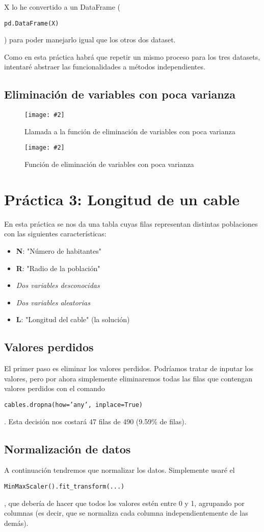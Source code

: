 \documentclass[
12pt, 
spanish, 
singlespacing,
headsepline
]{article}
\newcommand{\smallimage}[2]{
\begin{figure}[H]
	\caption{#1}
	\centering
	\texttt{[image: \#2]}
\end{figure}
}
\newcommand{\code}[1]{\colorbox{light-gray}{\parbox{\dimexpr\linewidth-2\fboxsep}{\strut  \texttt{#1}\strut}}}
\begin{document}
X lo he convertido a un DataFrame (\code{pd.DataFrame(X)}) para poder manejarlo igual que los otros dos dataset.

Como en esta práctica habrá que repetir un mismo proceso para los tres datasets, intentaré abstraer las funcionalidades a métodos independientes.

\subsection{Eliminación de variables con poca varianza}
\smallimage{Llamada a la función de eliminación de variables con poca varianza}{pl2/Figure_7.png}
\smallimage{Función de eliminación de variables con poca varianza}{pl2/Figure_7.1.png}

\section{Práctica 3: Longitud de un cable}
En esta práctica se nos da una tabla cuyas filas representan distintas poblaciones con las siguientes características:
\begin{itemize}
\item \textbf{N}: "Número de habitantes"
\item \textbf{R}: "Radio de la población"
\item \textit{Dos variables desconocidas}
\item \textit{Dos variables aleatorias}
\item \textbf{L}: "Longitud del cable" (la solución)
\end{itemize}

\subsection{Valores perdidos}
El primer paso es eliminar los valores perdidos. Podríamos tratar de inputar los valores, pero por ahora simplemente eliminaremos todas las filas que contengan valores perdidos con el comando \code{cables.dropna(how='any', inplace=True)}. Esta decisión nos costará 47 filas de 490 (9.59\% de filas).

\subsection{Normalización de datos}
A continuación tendremos que normalizar los datos. Simplemente usaré el \code{MinMaxScaler().fit_transform(...)}, que debería de hacer que todos los valores estén entre 0 y 1, agrupando por columnas (es decir, que se normaliza cada columna independientemente de las demás).
\end{document}
